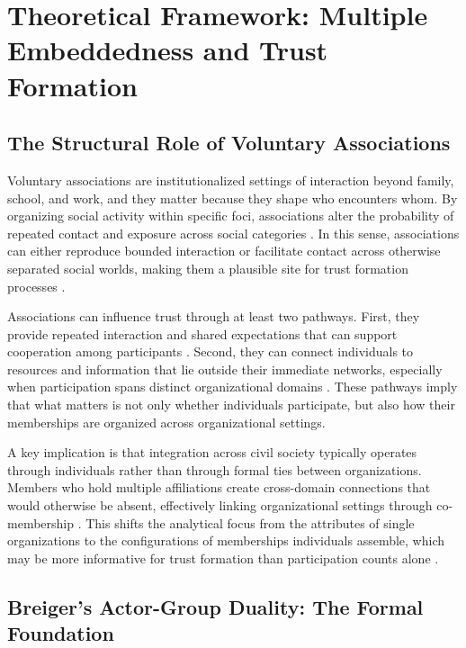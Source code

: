 \section{Theoretical Framework: Multiple Embeddedness and Trust Formation}

\subsection{The Structural Role of Voluntary Associations}

Voluntary associations are institutionalized settings of interaction beyond family, school, and work, and they matter because they shape who encounters whom. By organizing social activity within specific foci, associations alter the probability of repeated contact and exposure across social categories \parencite{knoke_associations_1986, feld_focused_1981}. In this sense, associations can either reproduce bounded interaction or facilitate contact across otherwise separated social worlds, making them a plausible site for trust formation processes \parencite{blau_exchange_1986, mcpherson_hypernetwork_1982}.

Associations can influence trust through at least two pathways. First, they provide repeated interaction and shared expectations that can support cooperation among participants \parencite{glanville_voluntary_2004, paxton_trust_2018}. Second, they can connect individuals to resources and information that lie outside their immediate networks, especially when participation spans distinct organizational domains \parencite{lin_social_2002, diani_cement_2015}. These pathways imply that what matters is not only whether individuals participate, but also how their memberships are organized across organizational settings.

A key implication is that integration across civil society typically operates through individuals rather than through formal ties between organizations. Members who hold multiple affiliations create cross-domain connections that would otherwise be absent, effectively linking organizational settings through co-membership \parencite{diani_cement_2015, pachucki_cultural_2010}. This shifts the analytical focus from the attributes of single organizations to the configurations of memberships individuals assemble, which may be more informative for trust formation than participation counts alone \parencite{moody_structural_2003, paxton_association_2007}.


\subsection{Breiger's Actor-Group Duality: The Formal Foundation}

